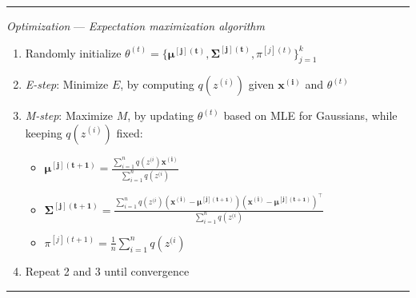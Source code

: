 {\color{lightgray}\hrule height 0.001mm}

\emph{Optimization} --- 
\emph{Expectation maximization algorithm}
\begin{enumerate}
    \item Randomly initialize $\theta^{(t)} = \{ \boldsymbol{\mu^{[j](t)}}, \boldsymbol{\Sigma^{[j](t)}}, \pi^{[j](t)} \}_{j=1}^k$
    \item \emph{E-step}: Minimize $E$, by computing $q(z^{(i)})$ given $\boldsymbol{x^{(i)}}$ and $\theta^{(t)}$
    \item \emph{M-step}: Maximize $M$, by updating $\theta^{(t)}$ based on MLE for Gaussians, while keeping $q(z^{(i)})$ fixed:
    \begin{itemize}
        \item $\boldsymbol{\mu^{[j](t+1)}} = \frac{ \sum_{i=1}^n q(z^{(i}) \boldsymbol{x^{(i)}} }{ \sum_{i=1}^n q(z^{(i}) }$
        \item $\boldsymbol{\Sigma^{[j](t+1)}} = \frac{ \sum_{i=1}^n q(z^{(i}) ( \boldsymbol{x^{(i)}} - \boldsymbol{\mu^{[j](t+1)}} )( \boldsymbol{x^{(i)}} - \boldsymbol{\mu^{[j](t+1)}} )^\intercal }{ \sum_{i=1}^n q(z^{(i}) }$
        \item $\pi^{[j](t+1)} = \frac{1}{n} \sum_{i=1}^n q(z^{(i})$
    \end{itemize}
    \item Repeat 2 and 3 until convergence
\end{enumerate}

{\color{black}\hrule height 0.001mm}

